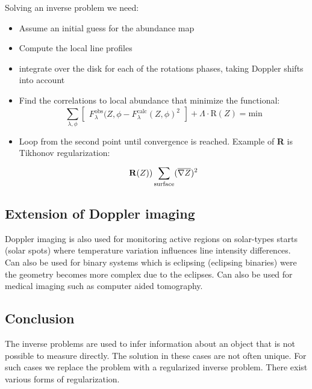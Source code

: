 	Solving an inverse problem we need: 

	\begin{itemize}
	    	\item Assume an initial guess for the abundance map
	    	\item Compute the local line profiles
	    	\item integrate over the disk for each of the rotations phases, taking Doppler shifts into account
	    	\item Find the correlations to local abundance that minimize the functional:
		    	\begin{equation}
		    		\sum_{\lambda, \phi}^{}\begin{bmatrix} F^{\text{obs}}_\lambda(Z,\phi - F^{\text{calc}}_\lambda(Z,\phi)^2 \end{bmatrix} + \Lambda \cdot \text{R}(Z) = \text{min}	  
		    	\end{equation} 
		    \item Loop from the second point until convergence is reached. Example of \textbf{R} is Tikhonov regularization:
			    \begin{equation}
			    	\text{\textbf{R}}(Z) ) \sum_{\text{surface}}^{}(\overline{\nabla Z})^2 
			    \end{equation}
	    \end{itemize}

	\subsection*{Extension of Doppler imaging}
	Doppler imaging is also used for monitoring active regions on solar-types starts (solar spots) where temperature variation influences line intensity differences. Can also be used for binary systems which is eclipsing (eclipsing binaries) were the geometry becomes more complex due to the eclipses. Can also be used for medical imaging such as computer aided tomography. 

	\subsection*{Conclusion}
	The inverse problems are used to infer information about an object that is not possible to measure directly. The solution in these cases are not often unique. For such cases we replace the problem with a regularized inverse problem. There exist various forms of regularization. 
	        











	 
